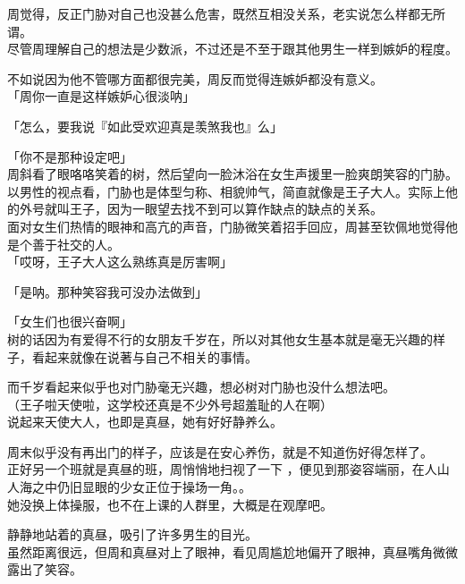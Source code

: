 周觉得，反正门胁对自己也没甚么危害，既然互相没关系，老实说怎么样都无所谓。\\

尽管周理解自己的想法是少数派，不过还是不至于跟其他男生一样到嫉妒的程度。

不如说因为他不管哪方面都很完美，周反而觉得连嫉妒都没有意义。\\

「周你一直是这样嫉妒心很淡呐」

「怎么，要我说『如此受欢迎真是羡煞我也』么」

「你不是那种设定吧」\\

周斜看了眼咯咯笑着的树，然后望向一脸沐浴在女生声援里一脸爽朗笑容的门胁。\\%

以男性的视点看，门胁也是体型匀称、相貌帅气，简直就像是王子大人。实际上他的外号就叫王子，因为一眼望去找不到可以算作缺点的缺点的关系。\\

面对女生们热情的眼神和高亢的声音，门胁微笑着招手回应，周甚至钦佩地觉得他是个善于社交的人。\\%

「哎呀，王子大人这么熟练真是厉害啊」

「是呐。那种笑容我可没办法做到」

「女生们也很兴奋啊」\\

树的话因为有爱得不行的女朋友千岁在，所以对其他女生基本就是毫无兴趣的样子，看起来就像在说著与自己不相关的事情。

而千岁看起来似乎也对门胁毫无兴趣，想必树对门胁也没什么想法吧。\\

（王子啦天使啦，这学校还真是不少外号超羞耻的人在啊）\\

说起来天使大人，也即是真昼，她有好好静养么。

周末似乎没有再出门的样子，应该是在安心养伤，就是不知道伤好得怎样了。\\

正好另一个班就是真昼的班，周悄悄地扫视了一下 ，便见到那姿容端丽，在人山人海之中仍旧显眼的少女正位于操场一角。。\\

她没换上体操服，也不在上课的人群里，大概是在观摩吧。

静静地站着的真昼，吸引了许多男生的目光。\\

虽然距离很远，但周和真昼对上了眼神，看见周尴尬地偏开了眼神，真昼嘴角微微露出了笑容。\\

